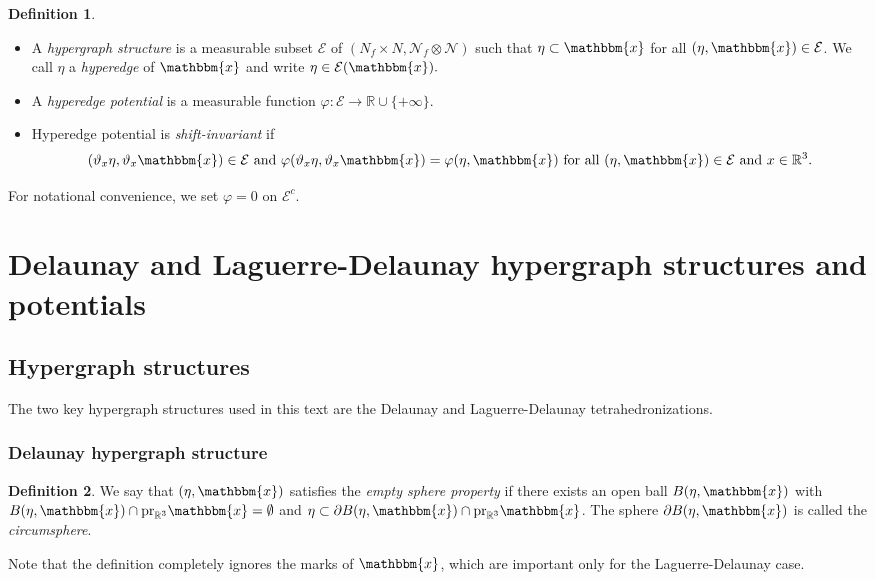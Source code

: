 \documentclass[12pt,a4paper]{article}
\newcommand{\R}{{\mathbb R^3}}
\theoremstyle{definition}
\newtheorem{definition}{Definition}
\theoremstyle{remark}
\theoremstyle{theorem}
\newcommand{\x}{\mathbbm{x}}
\begin{document}
\begin{definition}
	\begin{itemize}
		\item A \textit{hypergraph structure} is a measurable subset $\mathcal E$ of $(N_f\times N, \mathcal N_f \otimes \mathcal N)$ such that $\eta \subset \x$ for all $(\eta,\x)\in\mathcal E$. We call $\eta$ a \textit{hyperedge} of $\x$ and write $\eta \in \mathcal E(\x).$
		\item A \textit{hyperedge potential} is a measurable function $\varphi:\mathcal E\to \mathbb R \cup \{+\infty\}$. 
		\item Hyperedge potential is \textit{shift-invariant} if 
			$$(\vartheta_x \eta, \vartheta_x \x) \in \mathcal E \text{ and } \varphi(\vartheta_x \eta, \vartheta_x \x) = \varphi(\eta,\x) \text { for all } (\eta,\x)\in\mathcal E \text{ and }x \in \R.$$
	\end{itemize}
\end{definition}

For notational convenience, we set $\varphi = 0$ on $\mathcal E^c$. 



\section{Delaunay and Laguerre-Delaunay hypergraph structures and potentials}
\subsection{Hypergraph structures}
The two key hypergraph structures used in this text are the Delaunay and Laguerre-Delaunay tetrahedronizations. 

\subsubsection{Delaunay hypergraph structure}
\begin{definition}
We say that $(\eta,\x)$ satisfies the \textit{empty sphere property} if there exists an open ball $B(\eta,\x)$ with $B(\eta,\x)\cap \text{pr}_\R \x = \emptyset$ and $\eta \subset \partial B(\eta,\x) \cap \text{pr}_\R \x$. The sphere $\partial B(\eta,\x)$ is called the \textit{circumsphere}. 
\end{definition}
Note that the definition completely ignores the marks of $\x$, which are important only for the Laguerre-Delaunay case.
\end{document}
